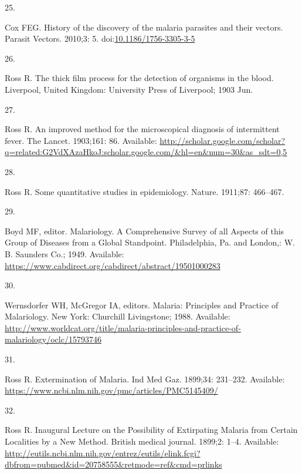 \documentclass[
]{book}
\newlength{\cslhangindent}
\newlength{\csllabelwidth}
\newenvironment{CSLReferences}[2] %
 {\begin{list}{}{%
  \setlength{\itemindent}{0pt}
  \setlength{\leftmargin}{0pt}
  \setlength{\parsep}{0pt}
  \ifodd #1
   \setlength{\leftmargin}{\cslhangindent}
   \setlength{\itemindent}{-1\cslhangindent}
  \fi
  \setlength{\itemsep}{#2\baselineskip}}}
 {\end{list}}
\newcommand{\CSLLeftMargin}[1]{\parbox[t]{\csllabelwidth}{\strut#1\strut}}
\newcommand{\CSLRightInline}[1]{\parbox[t]{\linewidth - \csllabelwidth}{\strut#1\strut}}
\begin{document}
\begin{CSLReferences}{0}{1}
\CSLLeftMargin{25. }%
\CSLRightInline{Cox FEG. History of the discovery of the malaria parasites and their vectors. Parasit Vectors. 2010;3: 5. doi:\href{https://doi.org/10.1186/1756-3305-3-5}{10.1186/1756-3305-3-5}}

\CSLLeftMargin{26. }%
\CSLRightInline{Ross R. The thick film process for the detection of organisms in the blood. {Liverpool, United Kingdom}: {University Press of Liverpool}; 1903 Jun. }

\CSLLeftMargin{27. }%
\CSLRightInline{Ross R. An improved method for the microscopical diagnosis of intermittent fever. The Lancet. 1903;161: 86. Available: \url{http://scholar.google.com/scholar?q=related:G2VdXAzaHkoJ:scholar.google.com/&hl=en&num=30&as_sdt=0,5}}

\CSLLeftMargin{28. }%
\CSLRightInline{Ross R. Some quantitative studies in epidemiology. Nature. 1911;87: 466--467. }

\CSLLeftMargin{29. }%
\CSLRightInline{Boyd MF, editor. Malariology. {A Comprehensive Survey} of all {Aspects} of this {Group} of {Diseases} from a {Global Standpoint}. {Philadelphia, Pa. and London,}: {W. B. Saunders Co.}; 1949. Available: \url{https://www.cabdirect.org/cabdirect/abstract/19501000283}}

\CSLLeftMargin{30. }%
\CSLRightInline{Wernsdorfer WH, McGregor IA, editors. Malaria: {Principles} and {Practice} of {Malariology}. {New York}: {Churchill Livingstone}; 1988. Available: \url{http://www.worldcat.org/title/malaria-principles-and-practice-of-malariology/oclc/15793746}}

\CSLLeftMargin{31. }%
\CSLRightInline{Ross R. Extermination of {Malaria}. Ind Med Gaz. 1899;34: 231--232. Available: \url{https://www.ncbi.nlm.nih.gov/pmc/articles/PMC5145409/}}

\CSLLeftMargin{32. }%
\CSLRightInline{Ross R. Inaugural {Lecture} on the {Possibility} of {Extirpating Malaria} from {Certain Localities} by a {New Method}. British medical journal. 1899;2: 1--4. Available: \url{http://eutils.ncbi.nlm.nih.gov/entrez/eutils/elink.fcgi?dbfrom=pubmed&id=20758555&retmode=ref&cmd=prlinks}}


\end{CSLReferences}
\end{document}
